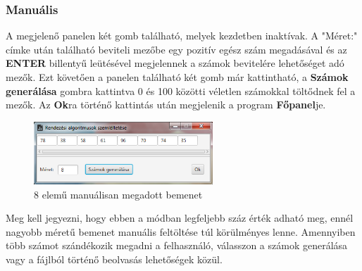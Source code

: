 \documentclass{elteikthesis}
\begin{document}
\subsubsection{Manuális}
A megjelenő panelen két gomb található, melyek kezdetben inaktívak. A "Méret:" címke után található beviteli mezőbe egy pozitív egész szám megadásával és az \textbf{ENTER} billentyű leütésével megjelennek a számok bevitelére lehetőséget adó mezők. Ezt követően a panelen található két gomb már kattintható, a \textbf{Számok generálása} gombra kattintva 0 és 100 közötti véletlen számokkal töltődnek fel a mezők. Az \textbf{Ok}ra történő kattintás után megjelenik a program \textbf{Főpanel}je.\par
\begin{figure}[H]
	\centering
	\includegraphics[width=0.6\textwidth]{pics/manualinput.png}
	\caption{8 elemű manuálisan megadott bemenet}
\end{figure}
Meg kell jegyezni, hogy ebben a módban legfeljebb száz érték adható meg, ennél nagyobb méretű bemenet manuális feltöltése túl körülményes lenne. Amennyiben több számot szándékozik megadni a felhasználó, válasszon a számok generálása vagy a fájlból történő beolvasás lehetőségek közül.
\end{document}
